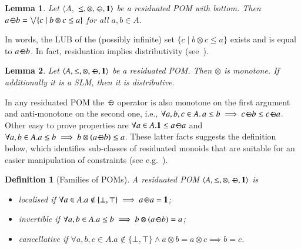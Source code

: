 \documentclass[preprint,12pt]{elsarticle}
\newtheorem{definition}{Definition}
\newtheorem{lemma}{Lemma}
\def\1{{\mathbf 1}}
\def\monid{{\mathbf 0}}
\def\1{{\mathbf 1}}
\def\monop{\otimes}
\def\odiv{\, {\ominus\hspace{-7.7pt} \div} \,}
\def\monid{\mathbf{1}}
\begin{document}
\begin{lemma}\label{rclm1}
	Let $\langle A,$ $\leq, \otimes,  \odiv, \1 \rangle$ be a residuated POM with bottom.
	Then $a \odiv b = \bigvee \{c \mid b \otimes c \leq a\}$ for all $a, b \in A$.
\end{lemma}

In words, the LUB of the (possibly infinite) set 
$\{c \mid b \otimes c \leq a\}$ exists and is equal to $a \odiv b$.
%
In fact, residuation implies distributivity (see~\cite[Lemma 2.2]{ipl17}).

\begin{lemma}\label{rclm2}
	Let $\langle A, \leq, \monop, \odiv, \1 \rangle$ be a residuated POM. 
	Then $\monop$ is monotone.
	If additionally it is a SLM, then it is distributive.
\end{lemma}



In any residuated POM the $\odiv$ operator is also monotone on the first argument and 
anti-monotone on the second one, i.e., 
$\forall a, b, c \in A.\, a\leq b \implies  c\odiv b \leq c \odiv a$.
%
Other easy to prove properties are
$\forall a\in A. \monid \leq a \odiv a$ and
$\forall a, b \in A. a \leq b \implies b \monop (a \odiv b) \leq a$.
These latter facts suggests the definition below, which identifies sub-classes 
of residuated monoids that are suitable for an easier manipulation
of constraints (see e.g.~\cite{ecai06}).

\begin{definition}[Families of POMs]
	A residuated POM $\langle A, \leq, \monop, \odiv, \monid \rangle$ is
	\begin{itemize}
		\item
		\emph{localised} if $\forall a \in A. a \not \in \{\bot,\top\} \implies a \odiv a = \1$;
		\item
		\emph{invertible} if $\forall a, b \in A. a \leq b \implies b \monop (a \odiv b) = a$;
		\item
		\emph{cancellative} if $\forall a, b, c \in A. a \not \in \{\bot,\top\} \wedge a \otimes b = a  \otimes c \implies b = c$.
	\end{itemize}
\end{definition}
\end{document}
